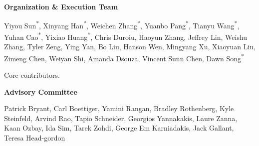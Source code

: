 \begingroup
\setlength{\parindent}{0pt}
\setlength{\parskip}{0pt}
\centering\small

{\normalsize\bfseries Organization \& Execution Team}\par\vspace{4pt}
Yiyou Sun\textsuperscript{*}, Xinyang Han\textsuperscript{*}, Weichen Zhang\textsuperscript{*}, Yuanbo Pang\textsuperscript{*}, Tianyu Wang\textsuperscript{*}, Yuhan Cao\textsuperscript{*}, Yixiao Huang\textsuperscript{*}, Chris Duroiu, Haoyun Zhang, Jeffrey Lin, Weishu Zhang, Tyler Zeng, Ying Yan, Bo Liu, Hanson Wen, Mingyang Xu, Xiaoyuan Liu, Zimeng Chen, Weiyan Shi, Amanda Dsouza, Vincent Sunn Chen, Dawn Song\textsuperscript{*}\par
\vspace{2pt}
{\footnotesize * Core contributors.\par}
\vspace{16pt}

{\normalsize\bfseries Advisory Committee}\par\vspace{4pt}
Patrick Bryant, Carl Boettiger, Yamini Rangan, Bradley Rothenberg, Kyle Steinfeld, Arvind Rao, Tapio Schneider, Georgios Yannakakis, Laure Zanna, Kaan Ozbay, Ida Sim, Tarek Zohdi, George Em Karniadakis, Jack Gallant, Teresa Head-gordon\par
\vspace{16pt}

